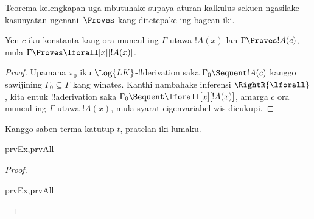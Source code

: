 \documentclass[../../../include/open-logic-section]{subfiles}
\begin{document}

\begin{explain}
  Teorema kelengkapan uga mbutuhake supaya aturan kalkulus sekuen
  ngasilake kasunyatan ngenani~$\Proves$ kang ditetepake ing bagean
  iki.
\end{explain}

\begin{thm}
 Yen $c$ iku konstanta kang ora
muncul ing $\Gamma$ utawa $!A(x)$ lan $\Gamma \Proves !A(c)$, mula
$\Gamma \Proves \lforall[x][!A(x)]$.
\end{thm}

\begin{proof}
Upamana $\pi_0$ iku $\Log{LK}$-!!{derivation} saka $\Gamma_0 \Sequent !A(c)$
kanggo sawijining $\Gamma_0 \subseteq \Gamma$ kang winates. Kanthi
nambahake inferensi $\RightR{\lforall}$, kita entuk !!a{derivation}
saka $\Gamma_0 \Sequent \lforall[x][!A(x)]$, amarga $c$ ora muncul ing
$\Gamma$ utawa $!A(x)$, mula syarat eigenvariabel wis dicukupi.
\end{proof}

\begin{prop}
Kanggo saben terma katutup $t$, pratelan iki lumaku.
\begin{tagenumerate}{prvEx,prvAll}
\end{tagenumerate}
\end{prop}

\begin{proof}
\begin{tagenumerate}{prvEx,prvAll}
\end{tagenumerate}
\end{proof}
\end{document}

